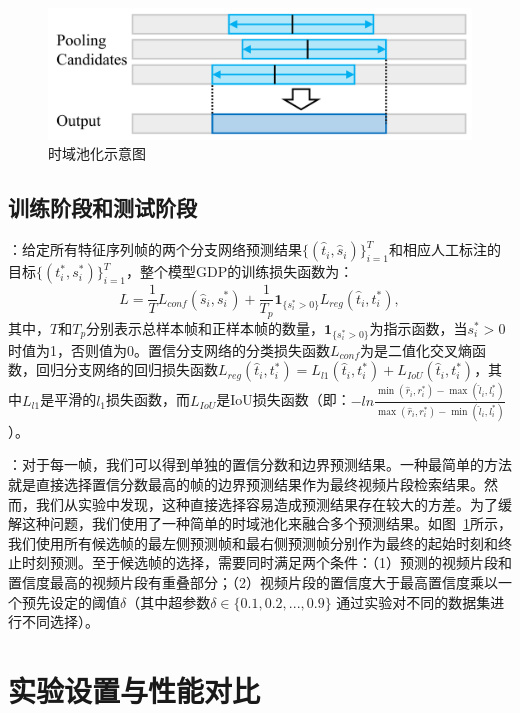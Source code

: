 \begin{figure}[t]
    \centering
    \includegraphics[width=0.8\linewidth]{chapter6/res/temporal_pooling.pdf}
    \caption{时域池化示意图}
    \label{ch6:fig:temporal_pooling}
\end{figure}

\subsection{训练阶段和测试阶段}

\textbf{}：给定所有特征序列帧的两个分支网络预测结果$\{(\hat{t}_i, \hat{s}_i)\}^T_{i=1}$和相应人工标注的目标$\{(t^*_i, s^*_i)\}^T_{i=1}$，整个模型GDP的训练损失函数为：
\begin{equation}
    L = \frac{1}{T}L_{conf}(\hat{s}_i, s^*_i) + \frac{1}{T_p}\mathbf{1}_{\{s^*_i>0\}}L_{reg}(\hat{t}_i, t^*_i),
\end{equation}
其中，$T$和$T_p$分别表示总样本帧和正样本帧的数量，$\mathbf{1}_{\{s^*_i>0\}}$为指示函数，当$s^*_i>0$时值为1，否则值为0。置信分支网络的分类损失函数$L_{conf}$为是二值化交叉熵函数，回归分支网络的回归损失函数$L_{reg}(\hat{t}_i, t^*_i) = L_{l1}(\hat{t}_i, t^*_i) + L_{IoU}(\hat{t}_i, t^*_i)$，其中$L_{l1}$是平滑的$l_1$损失函数，而$L_{IoU}$是IoU损失函数（即：$-ln\frac{\min(\hat{r}_i, r^*_i)-\max(\hat{l}_i, l^*_i)}{\max(\hat{r}_i, r^*_i)-\min(\hat{l}_i, l^*_i)}$）。


\textbf{}：对于每一帧，我们可以得到单独的置信分数和边界预测结果。一种最简单的方法就是直接选择置信分数最高的帧的边界预测结果作为最终视频片段检索结果。然而，我们从实验中发现，这种直接选择容易造成预测结果存在较大的方差。为了缓解这种问题，我们使用了一种简单的时域池化来融合多个预测结果。如图~\ref{ch6:fig:temporal_pooling}所示，我们使用所有候选帧的最左侧预测帧和最右侧预测帧分别作为最终的起始时刻和终止时刻预测。至于候选帧的选择，需要同时满足两个条件：（1）预测的视频片段和置信度最高的视频片段有重叠部分；（2）视频片段的置信度大于最高置信度乘以一个预先设定的阈值$\delta$（其中超参数$\delta \in \{0.1, 0.2, ..., 0.9 \}$ 通过实验对不同的数据集进行不同选择）。


\section{实验设置与性能对比}


